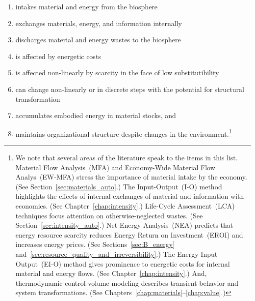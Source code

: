 \begin{enumerate}
	\item{\label{itm:intake}intakes material and energy from the biosphere}
	\item{\label{itm:internal_exchange}exchanges materials, energy, and information internally}
	\item{\label{itm:discharge}discharges material and energy wastes to the biosphere}
	\item{\label{itm:energetic_costs}is affected by energetic costs}
	\item{\label{itm:scarcity}is affected non-linearly by scarcity 
			in the face of low substitutibility}
	\item{\label{itm:non-linear}can change non-linearly or in discrete steps with the potential 
			for structural transformation}
	\item{\label{itm:embodies}accumulates embodied energy in material stocks, and}
	\item{\label{itm:robust}maintains organizational structure despite changes 
			in the environment.\footnote{We note that 
				several areas of the literature speak to the items in this list.
				Material Flow Analysis~(MFA) and 
				Economy-Wide Material Flow Analys~(EW-MFA)
				stress the importance of
				material intake by the economy. 
				(See Section~\ref{sec:materials_auto}.)
				The Input-Output~(I-O) method highlights the effects of internal exchanges
				of material and information with economies. 
				(See Chapter~\ref{chap:intensity}.)
				Life-Cycle Assessment~(LCA) techniques focus attention 
				on otherwise-neglected wastes. 
				(See Section~\ref{sec:intensity_auto}.)
				Net Energy Analysis~(NEA) predicts that energy resource 
				scarcity reduces Energy Return on Investment~(EROI)
				and increases energy prices.
				(See Sections~\ref{sec:B_energy} 
				and~\ref{sec:resource_quality_and_irreversibility}.)
				The Energy Input-Output~(EI-O) method gives prominence to energetic costs
				for internal material and energy flows.
				(See Chapter~\ref{chap:intensity}.)
				And, thermodynamic control-volume modeling describes
				transient behavior and system transformations.
				(See Chapters~\ref{chap:materials}--\ref{chap:value}.)
			}}
\end{enumerate}

